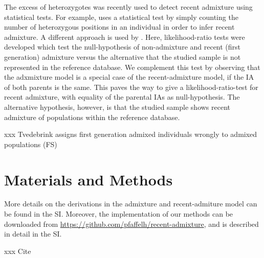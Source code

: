\documentclass[12pt]{article}
\theoremstyle{definition}
\begin{document}
The excess of heterozygotes was recently used to detect recent
admixture using statistical tests. For example, \cite{McNevin2019}
uses a statistical test by simply counting the number of heterozygous
positions in an individual in order to infer recent admixture. A
different approach is used by \cite{Tvedebrink2018a,
  Tvedebrink2018a}. Here, likelihood-ratio tests were developed which
test the null-hypothesis of non-admixture and recent (first
generation) admixture versus the alternative that the studied sample
is not represented in the reference database. We complement this test
by observing that the adxmixture model is a special case of the
recent-admixture model, if the IA of both parents is the same. This
paves the way to give a likelihood-ratio-test for recent admixture,
with equality of the parental IAs as null-hypothesis. The alternative
hypothesis, however, is that the studied sample shows recent admixture
of populations within the reference database.


xxx Tvedebrink assigns first generation admixed individuals wrongly to admixed populations (FS)

\section{Materials and Methods}
\sloppy More details on the derivations in the admixture and
recent-admiture model can be found in the SI. Moreover, the
implementation of our methods can be downloaded from \url{
  https://github.com/pfaffelh/recent-admixture}, and is described in
detail in the SI.

xxx Cite \cite{Hanis1986}
\end{document}
